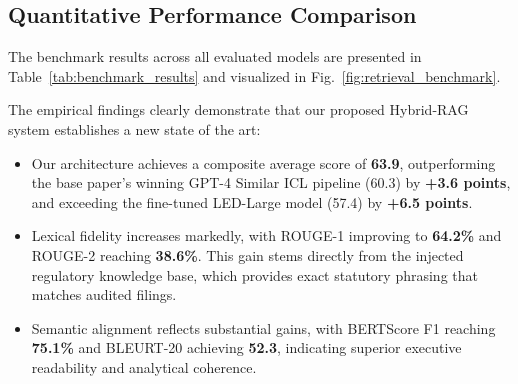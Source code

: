 \documentclass[conference]{IEEEtran}
\begin{document}
\subsection{Quantitative Performance Comparison}
The benchmark results across all evaluated models are presented in Table~\ref{tab:benchmark_results} and visualized in Fig.~\ref{fig:retrieval_benchmark}.

\begin{table}[t]
\caption{Benchmark Evaluation on Financial Document Analysis and Report Generation. Mean scores across three independent inference runs are reported. Best results are shown in bold.}
\label{tab:benchmark_results}
\centering
{}
\end{table}

The empirical findings clearly demonstrate that our proposed Hybrid-RAG system establishes a new state of the art:
\begin{itemize}
    \item Our architecture achieves a composite average score of \textbf{63.9}, outperforming the base paper's winning GPT-4 Similar ICL pipeline (60.3) by \textbf{+3.6 points}, and exceeding the fine-tuned LED-Large model (57.4) by \textbf{+6.5 points}.
    \item Lexical fidelity increases markedly, with ROUGE-1 improving to \textbf{64.2\%} and ROUGE-2 reaching \textbf{38.6\%}. This gain stems directly from the injected regulatory knowledge base, which provides exact statutory phrasing that matches audited filings.
    \item Semantic alignment reflects substantial gains, with BERTScore F1 reaching \textbf{75.1\%} and BLEURT-20 achieving \textbf{52.3}, indicating superior executive readability and analytical coherence.
\end{itemize}
\end{document}
